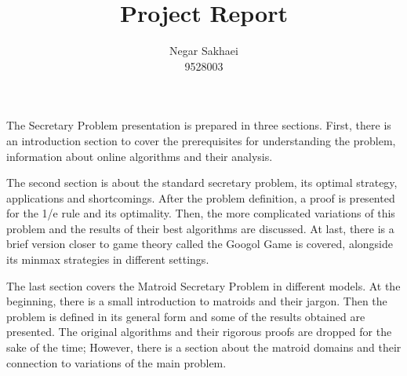\documentclass[14pt]{article}
\title{\textbf{Project Report} }
\author{Negar Sakhaei \\ 9528003}
\date{}
\begin{document}
\maketitle

\begin{Large}
The Secretary Problem presentation is prepared in three sections. First, there is an introduction section to cover the prerequisites for understanding the problem, information about online algorithms and their analysis. 
\\
\par
The second section is about the standard secretary problem, its optimal strategy, applications and shortcomings. After the problem definition, a proof is presented for the 1/e rule and its optimality. Then, the more complicated variations of this problem and the results of their best algorithms are discussed. At last, there is a brief version closer to game theory called the Googol Game is covered, alongside its minmax strategies in different settings.
\\
\par
 The last section covers the Matroid Secretary Problem in different models. At the beginning, there is a small introduction to matroids and their jargon. Then the problem is defined in its general form and some of the results obtained are presented. The original algorithms and their rigorous proofs are dropped for the sake of the time; However, there is a section about the matroid domains and their connection to variations of the main problem.
 \\
 \par
\end{Large}
\end{document}
